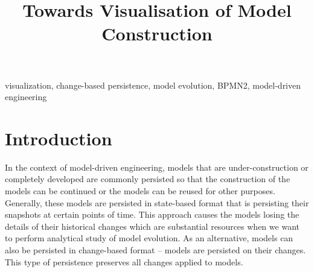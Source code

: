 \documentclass[conference]{IEEEtran}
\begin{document}
\title{Towards Visualisation of Model Construction
}

\author{
}
\maketitle

\begin{abstract}


\end{abstract}

\begin{IEEEkeywords}
visualization, change-based persistence, model evolution, BPMN2, model-driven engineering
\end{IEEEkeywords}

\section{Introduction}
\label{sec:introduction}
In the context of model-driven engineering, models that are under-construction or completely developed are commonly persisted 
so that the construction of the models can be continued or the models can be reused for other purposes. 
Generally, these models are persisted in state-based format that is persisting their snapshots at certain points of time. 
This approach causes the models losing the details of their historical changes which are substantial resources when 
we want to perform analytical study of model evolution. As an alternative, models can also be persisted in change-based format -- models are 
persisted on their changes. This type of persistence preserves all changes applied to models.
\end{document}
